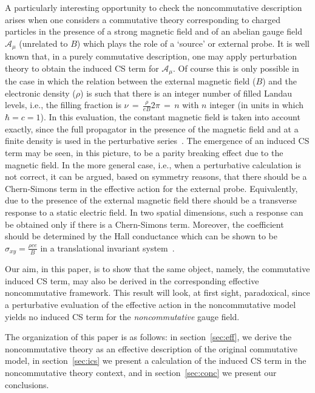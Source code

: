 \documentclass[a4paper,12pt]{article}
\begin{document}
A particularly interesting opportunity to check the noncommutative
description arises when one considers a commutative theory
corresponding to charged particles in the presence of a strong
magnetic field and of an abelian gauge field ${\mathcal A}_\mu$
(unrelated to $B$) which plays the role of a `source' or external
probe. It is well known that, in a purely commutative description, one
may apply perturbation theory to obtain the induced CS term for
${\mathcal A}_\mu$. Of course this is only possible in the case in which
the relation between the external magnetic field ($B$) and the
electronic density ($\rho$) is such that there is an integer number of
filled Landau levels, i.e., the filling fraction is \mbox{$\nu\,=\,
 { \frac{\rho }{e B}} 2\pi\,=\,n$} with $n$ integer (in units in 
which $\hbar=c=1$).
In this evaluation, the constant magnetic field is taken into account
exactly, since the full propagator in the presence of the magnetic
field and at a finite density is used in the perturbative
series~\cite{lf}. The emergence of an induced CS term may be seen, in
this picture, to be a parity breaking effect due to the magnetic
field.  In the more general case, i.e., when a perturbative
calculation is not correct, it can be argued, based on symmetry
reasons, that there should be a Chern-Simons term in the effective
action for the external probe. Equivalently, due to the presence of
the external magnetic field there should be a transverse response to a
static electric field. In two spatial dimensions, such a response can
be obtained only if there is a Chern-Simons term. Moreover, the
coefficient should be determined by the Hall conductance which can be
shown to be $\sigma_{xy}={\frac {\rho c e}{B}}$ in a translational invariant
system~\cite{PG}.


Our aim, in this paper, is to show that the same object, namely, the
commutative induced CS term, may also be derived in the corresponding
effective noncommutative framework. This result will look, at first
sight, paradoxical, since a perturbative evaluation of the effective
action in the noncommutative model yields no induced CS term for the
{\em noncommutative\/} gauge field. 

The organization of this paper is as follows: in
section~\ref{sec:eff}, we derive the noncommutative theory as an
effective description of the original commutative model, in
section~\ref{sec:ics} we present a calculation of the induced CS term
in the noncommutative theory context, and in section~\ref{sec:conc} we
present our conclusions.
\end{document}
